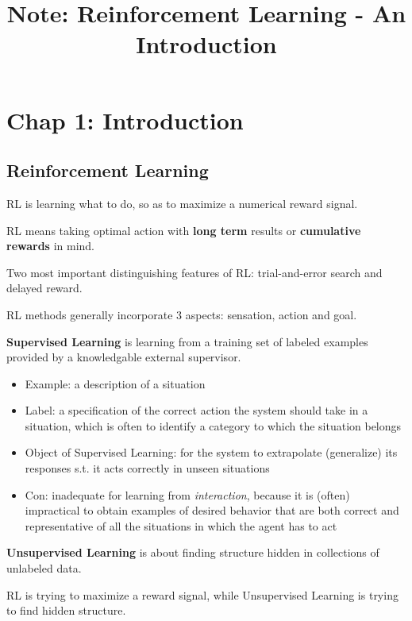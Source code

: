 \documentclass[lang=en,mode=geye,device=normal,color=blue,14pt]{elegantnote}
\title{Note: Reinforcement Learning - An Introduction}
\DeclareMathOperator*{\1}{\mathbbm{1}}
\begin{document}
\maketitle

\setlength{\parindent}{0pt}

\newpage

\section{Chap 1: Introduction}
\subsection{Reinforcement Learning}

RL is learning what to do, so as to maximize a numerical reward signal.

RL means taking optimal action with \textbf{long term} results or \textbf{cumulative rewards} in mind.

Two most important distinguishing features of RL: trial-and-error search and delayed reward.

RL methods generally incorporate 3 aspects: sensation, action and goal.

\begin{definition}
\textbf{Supervised Learning} is learning from a training set of labeled examples provided by a knowledgable external supervisor.
\end{definition}

\begin{itemize}
	\item Example: a description of a situation
	\item Label: a specification of the correct action the system should take in a situation, which is often to identify a category to which the situation belongs
	\item Object of Supervised Learning: for the system to extrapolate (generalize) its responses s.t. it acts correctly in unseen situations
	\item Con: inadequate for learning from \textit{interaction}, because it is (often) impractical to obtain examples of desired behavior that are both correct and representative of all the situations in which the agent has to act
\end{itemize}

\begin{definition}
\textbf{Unsupervised Learning} is about finding structure hidden in collections of unlabeled data.
\end{definition}
RL is trying to maximize a reward signal, while Unsupervised Learning is trying to find hidden structure.
\end{document}
